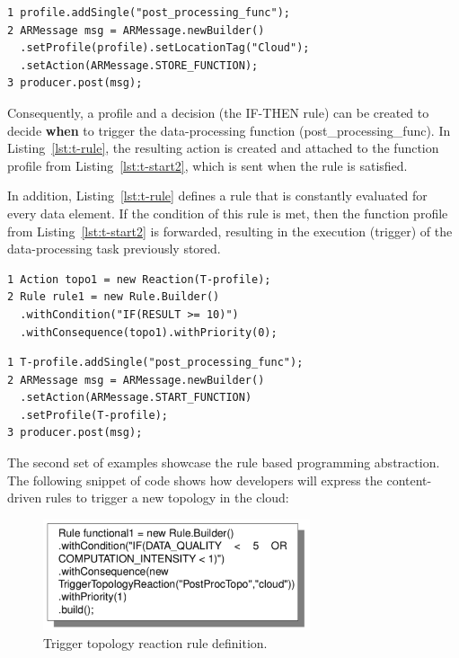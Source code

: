 \begin{lstlisting}[language=mylang, caption={Store post-processing task in the R-Pulsar overlay network.}, captionpos=b, label={lst:ed2}]
1 profile.addSingle("post_processing_func");
2 ARMessage msg = ARMessage.newBuilder()
  .setProfile(profile).setLocationTag("Cloud");
  .setAction(ARMessage.STORE_FUNCTION);
3 producer.post(msg);
\end{lstlisting}

Consequently, a profile and a decision (the IF-THEN rule) can be created to decide \textbf{when} to trigger the data-processing function (post\_processing\_func). In Listing~\ref{lst:t-rule}, the resulting action is created and attached to the function profile from Listing~\ref{lst:t-start2}, which is sent when the rule is satisfied.

In addition, Listing~\ref{lst:t-rule} defines a rule that is constantly evaluated for every data element. If the condition of this rule is met, then the function profile from Listing~\ref{lst:t-start2} is forwarded, resulting in the execution (trigger) of the data-processing task previously stored.

\begin{lstlisting}[language=mylang, caption={Rule based programming abstraction for deploying the post-processing task.}, captionpos=b, label={lst:t-rule}]
1 Action topo1 = new Reaction(T-profile);
2 Rule rule1 = new Rule.Builder()
  .withCondition("IF(RESULT >= 10)")
  .withConsequence(topo1).withPriority(0);
\end{lstlisting}

\begin{lstlisting}[language=mylang, caption={Profile for deploying the post-processing task.}, captionpos=b, label={lst:t-start2}]
1 T-profile.addSingle("post_processing_func");
2 ARMessage msg = ARMessage.newBuilder()
  .setAction(ARMessage.START_FUNCTION)
  .setProfile(T-profile);
3 producer.post(msg);
\end{lstlisting}

The second set of examples showcase the rule based programming abstraction. The following snippet of code shows how developers will express the content-driven rules to trigger a new topology in the cloud:

\begin{figure}[h!]
  \centering
  \includegraphics[width=0.7\textwidth]{Figures/RuleTopology.pdf}
  \caption{Trigger topology reaction rule definition.}
  \label{fig:RuleTopology}
\end{figure}

